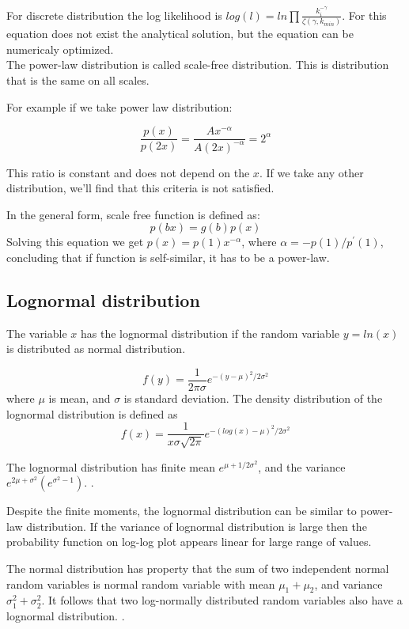 For discrete distribution the log likelihood is $log(l) = ln\prod \frac{k_i^{-\gamma}}{\zeta(\gamma, k_{min})}$. For this equation does not exist the analytical solution, but the equation can be numericaly optimized. \\

The power-law distribution is called scale-free distribution. This is distribution that is the same on all scales. 

For example if we take power law distribution:

$$\frac{p(x)}{p(2x)} = \frac{Ax^{-\alpha}}{A(2x)^{-\alpha}} = 2^{\alpha}$$ 

This ratio is constant and does not depend on the $x$. If we take any other distribution, we'll find that this criteria is not satisfied. 

In the general form, scale free function is defined as:
$$p(bx) = g(b)p(x)$$ 
Solving this equation we get $p(x)=p(1)x^{-\alpha}$, where $\alpha=-p(1)/p^{'}(1)$, concluding that if function is self-similar, it has to be a power-law. 





\subsection{Lognormal distribution}

The variable $x$ has the lognormal distribution if the random variable $y=ln(x)$ is distributed as normal distribution. 

\begin{equation}
f(y) = \frac{1}{2\pi\sigma}e^{-(y-\mu)^2/2\sigma^2}
\end{equation}
where $\mu$ is mean, and $\sigma$ is standard deviation. The density distribution of the lognormal distribution is defined as
\begin{equation}
f(x) = \frac{1}{x \sigma \sqrt{2\pi}}e^{-(log(x)-\mu)^2 /2\sigma^2} 
\end{equation}

The lognormal distribution has finite mean $e^{\mu+1/2\sigma^2}$, and the variance $e^{2\mu+\sigma^2}(e^{\sigma^2 -1})$.  \cite{mitzenmacher2004brief}.

Despite the finite moments, the lognormal distribution can be similar to power-law distribution. If the variance of lognormal distribution is large then the probability function on log-log plot appears linear for large range of values. 

The normal distribution has property that the sum of two independent normal random variables is normal random variable with mean $\mu_1+\mu_2$, and variance $\sigma_1^2+ \sigma_2^2$. It follows that two log-normally distributed random variables also have a lognormal distribution. \cite{mitzenmacher2004brief}. 

